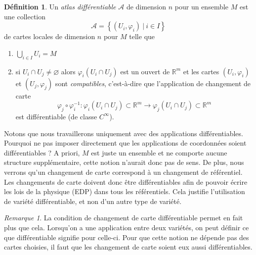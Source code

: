 \documentclass[a4paper,11pt]{report}
\theoremstyle{definition}
\theoremstyle{plain}
\theoremstyle{definition}
\newtheorem{defn}{Définition}[chapter]
\theoremstyle{remark}
\newtheorem{rmk}{Remarque}[chapter]
\newcommand{\A}{\mathcal{A}}
\newcommand{\Rm}{\mathbb{R}^m}
\begin{document}
            \begin{defn}
                Un \textit{atlas différentiable} $\A$ de dimension $n$ pour un ensemble $M$ est une collection 
                \begin{equation}
                    \A = \left\{ (U_i,\varphi_i)~|~i\in I \right\}
                \end{equation}
                de cartes locales de dimension $n$ pour $M$ telle que
                \begin{enumerate}[label=\textit{(\roman*)}]
                    \item $\bigcup_{i\in I} U_i = M$
                    \item si $U_i\cap U_j \neq \varnothing$ alors $\varphi_i(U_i\cap U_j)$ est un ouvert de $\Rm$ et les cartes $(U_i,\varphi_i)$ et $(U_j,\varphi_j)$ sont \textit{compatibles}, c'est-à-dire que l'application de changement de carte
                        \begin{equation}
                            \varphi_j\circ\varphi_i^{-1}:\varphi_i(U_i\cap U_j)\subset\Rm\to\varphi_j(U_i\cap U_j)\subset\Rm
                        \end{equation}
                        est différentiable (de classe $C^\infty$).
                \end{enumerate}
            \end{defn}
            
            Notons que nous travaillerons uniquement avec des applications différentiables. Pourquoi ne pas imposer directement que les applications de coordonnées soient différentiables ? A priori, $M$ est juste un ensemble et ne comporte aucune structure supplémentaire, cette notion n'aurait donc pas de sens. De plus, nous verrons qu'un changement de carte correspond à un changement de référentiel. Les changements de carte doivent donc être différentiables afin de pouvoir écrire les lois de la physique (EDP) dans tous les référentiels. Cela justifie l'utilisation de variété différentiable, et non d'un autre type de variété.
            
            \begin{rmk}
                La condition de changement de carte différentiable permet en fait plus que cela. Lorsqu'on a une application entre deux variétés, on peut définir ce que différentiable signifie pour celle-ci. Pour que cette notion ne dépende pas des cartes choisies, il faut que les changement de carte soient eux aussi différentiables.
            \end{rmk}
            
\end{document}
